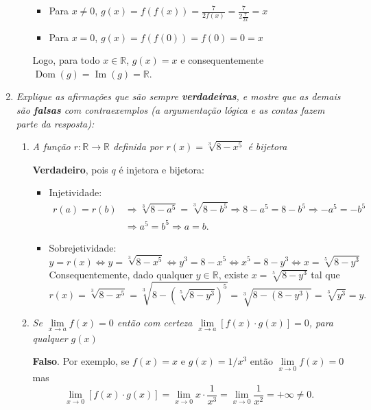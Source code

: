 \documentclass[12pt,a4paper]{article}
\newcommand*\dom[1]{\operatorname{Dom}\left(#1\right)}
\newcommand*\im[1]{\operatorname{Im}\left(#1\right)}
\newcommand*\R{\mathbb{R}}
\begin{document}
\begin{enumerate}
\begin{enumerate}
\begin{itemize}
\item Para $x \neq 0$,
$\displaystyle g(x) = f(f(x))
= \frac{7}{2f(x)}
= \frac{7}{2\frac{7}{2x}}
= x
$
\item Para $x = 0$,
$g(x) = f(f(0))
= f(0)
= 0
= x$
\end{itemize}

Logo, para todo $x \in \R$, $g(x) = x$ e consequentemente $\dom{g} = \im{g} = \R$.

\end{enumerate}

\item \textit{Explique as afirmações que são sempre \textbf{verdadeiras}, e mostre que as demais são \textbf{falsas} com contraexemplos (a argumentação lógica e as contas fazem parte da resposta):}


\begin{enumerate}
\item \textit{A função $r: \mathbb{R} \to \mathbb{R}$ definida por $\displaystyle r(x) = \sqrt[3]{8 - x^5}$ é bijetora}

\textbf{Verdadeiro}, pois $q$ é injetora e bijetora:
\begin{itemize}
\item Injetividade:
\begin{align*}
r(a) = r(b)
& \Rightarrow \sqrt[3]{8 - a^5} = \sqrt[3]{8 - b^5}
  \Rightarrow 8 - a^5 = 8 - b^5
  \Rightarrow - a^5 = - b^5 \\
& \Rightarrow a^5 = b^5
  \Rightarrow a = b.
\end{align*}
\item Sobrejetividade:
\[
y = r(x)
\Leftrightarrow y = \sqrt[3]{8 - x^5}
\Leftrightarrow y^3 = 8 - x^5
\Leftrightarrow x^5 = 8 - y^3
\Leftrightarrow x = \sqrt[5]{8 - y^3}
\]
Consequentemente, dado qualquer $y \in \mathbb{R}$, existe $x = \sqrt[5]{8 - y^3}$ tal que
\[
r(x) = \sqrt[3]{8 - x^5}
     = \sqrt[3]{8 - (\sqrt[5]{8 - y^3})^5}
     = \sqrt[3]{8 - (8 - y^3)}
     = \sqrt[3]{y^3}
     = y.
\]

\end{itemize}

\item \textit{Se $\lim\limits_{x\to a} f(x) = 0$ então com certeza $\lim\limits_{x\to a} [ f(x) \cdot g(x) ] = 0$, para qualquer $g(x)$}

\textbf{Falso}. Por exemplo, se $f(x) = x$ e $g(x) = 1/x^3$ então $\lim\limits_{x\to 0} f(x) = 0$ mas
\[
\lim\limits_{x\to 0} [ f(x) \cdot g(x) ]
= \lim\limits_{x \to 0} x \cdot \frac{1}{x^3}
= \lim\limits_{x \to 0} \frac{1}{x^2}
= +\infty \neq 0.
\]


\end{enumerate}
\end{enumerate}
\end{document}
